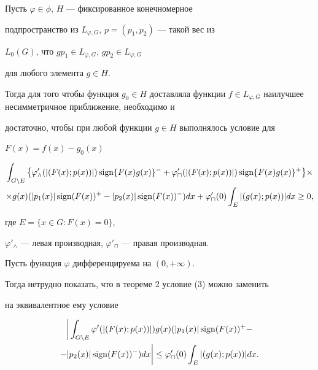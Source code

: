 \begin{thm} 


Пусть $\varphi\in \phi$, $H$ --- фиксированное конечномерное 


подпространство из $L_{\varphi,G}$, $p=(p_1,p_2)$ --- такой вес из 


$L_0(G)$, что $gp_1\in L_{\varphi,G}$, $gp_2\in L_{\varphi,G}$ 


для любого элемента $g\in H$. 


 


Тогда для того чтобы функция $g_0\in H$ доставляла функции $f\in 


L_{\varphi,G}$ наилучшее несимметричное приближение, необходимо и 


достаточно, чтобы при любой функции $g\in H$ выполнялось условие для 


$F(x)=f(x)-g_0(x)$ 


\begin{multline} 


\int_{G\setminus E}\big\{\varphi'_\wedge(|(F(x);p(x))|)\sign\{F(x)g(x) 


\}^-+\varphi'_\sqcap(|(F(x);p(x))|)\sign 


\{F(x)g(x)\}^+\big\}\times \\ 


% 


\times g(x)(|p_1(x)|\sign(F(x))^+-|p_2(x)|\sign(F(x))^-) 


dx+\varphi'_\sqcap(0)\int_E|(g(x);p(x))|dx\ge0, 


\end{multline} 


где $E=\{x\in G:F(x)=0\}$,


$\varphi'_\wedge$ --- левая производная, $\varphi'_\sqcap$ --- правая производная. 


\end{thm} 


 


 


\begin{note} 


Пусть функция $\varphi$ дифференцируема на $(0,+\infty)$. 


Тогда нетрудно показать, что в теореме 2 условие (3) можно заменить 


на эквивалентное ему условие 


\begin{multline*} 


\bigg|\int_{G\setminus E}\varphi'(|(F(x);p(x))|)g(x) 


(|p_1(x)|\sign(F(x))^+ -\\ 


% 


-|p_2(x)|\sign(F(x))^-)dx\bigg|\le\varphi'_\sqcap(0) 


\int_E|(g(x);p(x))|dx. 


\end{multline*} 


\end{note} 


